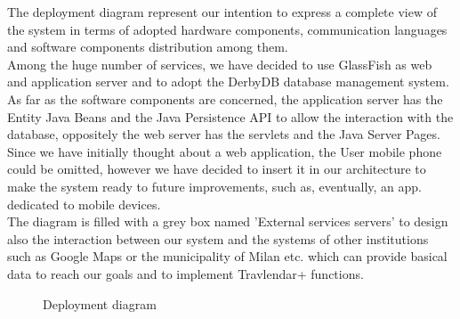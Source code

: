 The deployment diagram represent our intention to express a complete view of the system in terms of adopted hardware components, communication languages and  software components distribution among them. \\
Among the huge number of services, we have decided to use GlassFish as web and application server and to adopt the DerbyDB database management system. \\
As far as the software components are concerned, the application server has the Entity Java Beans and the Java Persistence API to allow the interaction with the database, oppositely the web server has the servlets and  the Java Server Pages.\\
Since we have initially thought about a web application, the User mobile phone could be omitted, however we have decided to insert it in our architecture to make the system ready to future improvements, such as, eventually, an app. dedicated to mobile devices. \\ 
The diagram is filled with a grey box named 'External services servers' to design also the interaction between our system and the systems of other institutions such as Google Maps or the municipality of Milan etc. which can provide basical data to reach our goals and to implement Travlendar+ functions.\\


\begin{figure} 
\begin{center}

\caption{Deployment diagram} 
\label{fig:deploymentdiagram} 


\end{center}
\end{figure} 